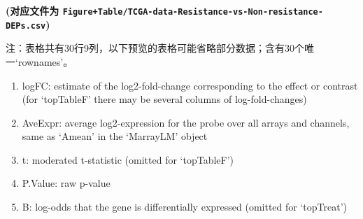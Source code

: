 \documentclass[
]{article}
\providecommand{\tightlist}{%
  \setlength{\itemsep}{0pt}\setlength{\parskip}{0pt}}
\begin{document}
\textbf{(对应文件为 \texttt{Figure+Table/TCGA-data-Resistance-vs-Non-resistance-DEPs.csv})}

\begin{center}\begin{tcolorbox}[colback=gray!10, colframe=gray!50, width=0.9\linewidth, arc=1mm, boxrule=0.5pt]注：表格共有30行9列，以下预览的表格可能省略部分数据；含有30个唯一`rownames'。
\end{tcolorbox}
\end{center}
\begin{center}\begin{tcolorbox}[colback=gray!10, colframe=gray!50, width=0.9\linewidth, arc=1mm, boxrule=0.5pt]\begin{enumerate}\tightlist
\item logFC:  estimate of the log2-fold-change corresponding to the effect or contrast (for ‘topTableF’ there may be several columns of log-fold-changes)
\item AveExpr:  average log2-expression for the probe over all arrays and channels, same as ‘Amean’ in the ‘MarrayLM’ object
\item t:  moderated t-statistic (omitted for ‘topTableF’)
\item P.Value:  raw p-value
\item B:  log-odds that the gene is differentially expressed (omitted for ‘topTreat’)
\end{enumerate}\end{tcolorbox}
\end{center}
\end{document}
